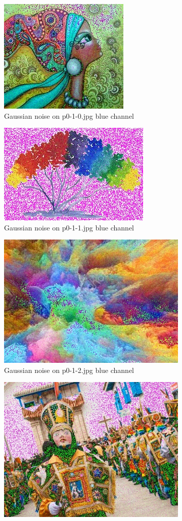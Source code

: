 \begin{enumerate}[label=\emph{\alph*)}]
\begin{figure}[h!]
\centering
  \begin{subfigure}{0.5\textwidth}
    \centering
    \includegraphics[width=0.5\linewidth]{../output/p0-5-a-0.jpg}
    \caption{Gaussian noise on p0-1-0.jpg blue channel}
  \end{subfigure}%
\begin{subfigure}{0.5\textwidth}
  \centering
  \includegraphics[width=0.5\linewidth]{../output/p0-5-a-1.jpg}
  \caption{Gaussian noise on p0-1-1.jpg blue channel}
  \label{fig:sfig2}
\end{subfigure}
\begin{subfigure}{0.5\textwidth}
  \centering
  \includegraphics[width=0.5\linewidth]{../output/p0-5-a-2.jpg}
  \caption{Gaussian noise on p0-1-2.jpg blue channel}
  \label{fig:sfig1}
\end{subfigure}%
\begin{subfigure}{0.5\textwidth}
  \centering
  \includegraphics[width=0.5\linewidth]{../output/p0-5-a-3.jpg}

\end{subfigure}
\end{figure}
\end{enumerate}
